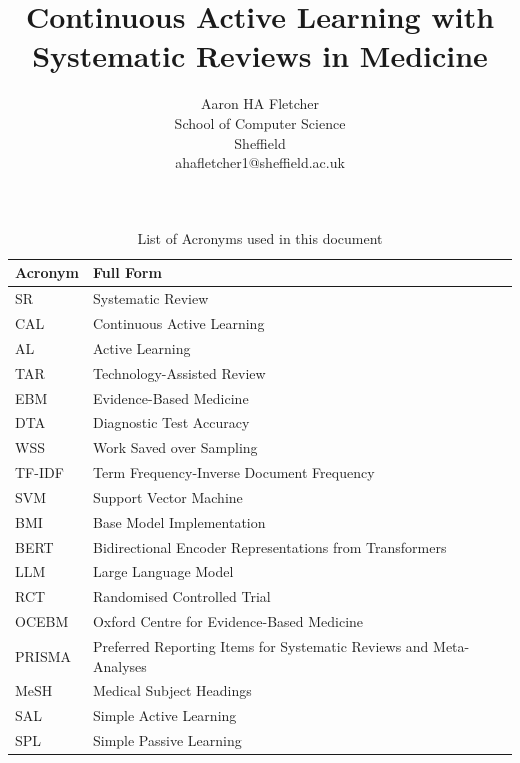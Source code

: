 \documentclass[10pt, english]{article}
\title{\textbf{Continuous Active Learning with Systematic Reviews in Medicine}}
\author{
    \fontsize{11}{13}\selectfont 
    Aaron HA Fletcher \\
    \fontsize{10}{11}\selectfont 
     School of Computer Science\\
    \fontsize{10}{11}\selectfont 
    Sheffield\\
    \fontsize{10}{11}\selectfont
    ahafletcher1@sheffield.ac.uk\\
}
\date{}
\begin{document}
\renewcommand{\abstractname}{} %
\maketitle %
\newpage

\begin{table}[t]
    \centering
    \begin{tabular}{|l|l|}
    \hline
    \textbf{Acronym} & \textbf{Full Form} \\
    \hline
    SR & Systematic Review \\
    CAL & Continuous Active Learning \\
    AL & Active Learning \\
    TAR & Technology-Assisted Review \\
    EBM & Evidence-Based Medicine \\
    DTA & Diagnostic Test Accuracy \\
    WSS & Work Saved over Sampling \\
    TF-IDF & Term Frequency-Inverse Document Frequency \\
    SVM & Support Vector Machine \\
    BMI & Base Model Implementation \\
    BERT & Bidirectional Encoder Representations from Transformers \\
    LLM & Large Language Model \\
    RCT & Randomised Controlled Trial \\
    OCEBM & Oxford Centre for Evidence-Based Medicine \\
    PRISMA & Preferred Reporting Items for Systematic Reviews and Meta-Analyses \\
    MeSH & Medical Subject Headings \\
    SAL & Simple Active Learning \\
    SPL & Simple Passive Learning \\
    \hline
    \end{tabular}
    \caption{List of Acronyms used in this document}
    \label{tab:acronyms}
    \end{table}

\newpage


\setlength{\absleftindent}{0em}
\setlength{\absrightindent}{0em}

\begin{abstract}
\newpage 
    \abstractText %
\end{abstract}
\newpage
\tableofcontents
\newpage
\newcommand{\lightshadowbox}[1]{%
  \setlength{\fboxsep}{6pt}%
  \setlength{\shadowsize}{1pt}%
  \shadowbox{#1}%
}
\end{document}

